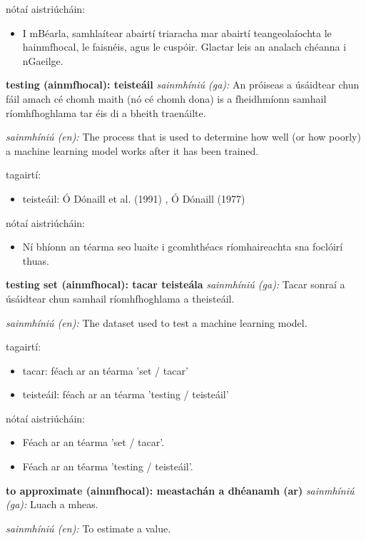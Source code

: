 \documentclass{article}
\begin{document}
nótaí aistriúcháin:
\begin{itemize}
	\item I mBéarla, samhlaítear abairtí triaracha mar abairtí teangeolaíochta le hainmfhocal, le faisnéis, agus le cuspóir. Glactar leis an analach chéanna i nGaeilge.
\end{itemize}


\textbf{testing (ainmfhocal): teisteáil}
\textit{sainmhíniú (ga):} An próiseas a úsáidtear chun fáil amach cé chomh maith (nó cé chomh dona) is a fheidhmíonn samhail ríomhfhoghlama tar éis di a bheith traenáilte.

\textit{sainmhíniú (en):} The process that is used to determine how well (or how poorly) a machine learning model works after it has been trained.

tagairtí:
\begin{itemize}
	\item teisteáil: Ó Dónaill et al. (1991) \cite{focloir-beag}, Ó Dónaill (1977) \cite{odonaill}
\end{itemize}

nótaí aistriúcháin:
\begin{itemize}
	\item Ní bhíonn an téarma seo luaite i gcomhthéacs ríomhaireachta sna foclóirí thuas.
\end{itemize}


\textbf{testing set (ainmfhocal): tacar teisteála}
\textit{sainmhíniú (ga):} Tacar sonraí a úsáidtear chun samhail ríomhfhoghlama a theisteáil.

\textit{sainmhíniú (en):} The dataset used to test a machine learning model.

tagairtí:
\begin{itemize}
	\item tacar: féach ar an téarma 'set / tacar'
	\item teisteáil: féach ar an téarma 'testing / teisteáil'
\end{itemize}

nótaí aistriúcháin:
\begin{itemize}
	\item Féach ar an téarma 'set / tacar'.
	\item Féach ar an téarma 'testing / teisteáil'.
\end{itemize}


\textbf{to approximate (ainmfhocal): meastachán a dhéanamh (ar)}
\textit{sainmhíniú (ga):} Luach a mheas.

\textit{sainmhíniú (en):} To estimate a value.
\end{document}
